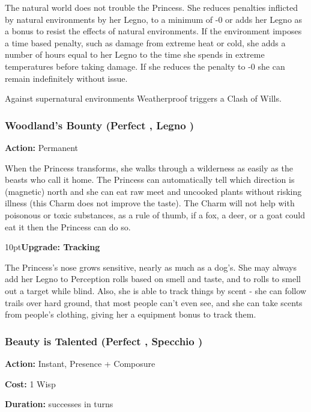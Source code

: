 The natural world does not trouble the Princess. She reduces penalties inflicted by natural environments by her Legno, to a minimum of -0 or adds her Legno as a bonus to resist the effects of natural environments. If the environment imposes a time based penalty, such as damage from extreme heat or cold, she adds a number of hours equal to her Legno to the time she spends in extreme temperatures before taking damage. If she reduces the penalty to -0 she can remain indefinitely without issue. 

Against supernatural environments Weatherproof triggers a Clash of Wills.

\subsubsection*{Woodland's Bounty (Perfect \textbullet, Legno \textbullet)}

\noindent \textbf{Action:} Permanent

When the Princess transforms, she walks through a wilderness as easily as the beasts who call it home. The Princess can automatically tell which direction is (magnetic) north and she can eat raw meet and uncooked plants without risking illness (this Charm does not improve the taste). The Charm will not help with poisonous or toxic substances, as a rule of thumb, if a fox, a deer, or a goat could eat it then the Princess can do so. 

\begin{myindentpar}{10pt}\textbf{Upgrade: Tracking}

The Princess's nose grows sensitive, nearly as much as a dog's. She may always add her Legno to Perception rolls based on smell and taste, and to rolls to smell out a target while blind. Also, she is able to track things by scent - she can follow trails over hard ground, that most people can't even see, and she can take scents from people's clothing, giving her a equipment bonus to track them.\end{myindentpar}

\subsubsection*{Beauty is Talented (Perfect \textbullet, Specchio \textbullet)}

\noindent \textbf{Action:} Instant, Presence + Composure

\noindent \textbf{Cost:} 1 Wisp

\noindent \textbf{Duration:} successes in turns \\


